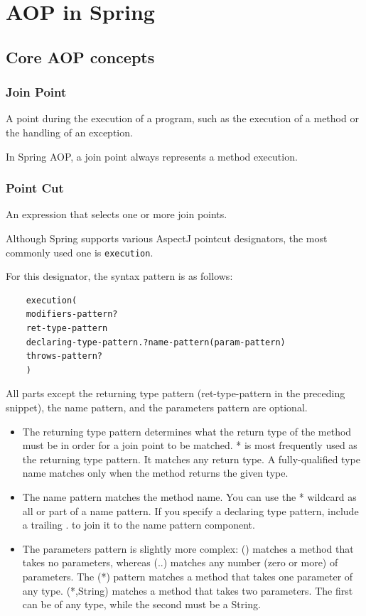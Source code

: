 \documentclass{scrartcl}
\begin{document}
\section{AOP in Spring}

\subsection{Core AOP concepts}

\subsubsection{Join Point}

A point during the execution of a program, such as the execution of a method or the handling of an exception.

In Spring AOP, a join point always represents a method execution.


\subsubsection{Point Cut}

An expression that selects one or more join points.

Although Spring supports various AspectJ pointcut designators, the most commonly used one is \lstinline{execution}.

For this designator, the syntax pattern is as follows:

\begin{lstlisting}
    execution(
    modifiers-pattern?
    ret-type-pattern
    declaring-type-pattern.?name-pattern(param-pattern)
    throws-pattern?
    )
\end{lstlisting}

All parts except the returning type pattern (ret-type-pattern in the preceding snippet), the name pattern, and the parameters pattern are optional.

\begin{itemize}
    \item The returning type pattern determines what the return type of the method must be in order for a join point to be matched. * is most frequently used as the returning type pattern. It matches any return type. A fully-qualified type name matches only when the method returns the given type.
    \item  The name pattern matches the method name. You can use the * wildcard as all or part of a name pattern. If you specify a declaring type pattern, include a trailing . to join it to the name pattern component.
    \item The parameters pattern is slightly more complex: () matches a method that takes no parameters, whereas (..) matches any number (zero or more) of parameters. The (*) pattern matches a method that takes one parameter of any type. (*,String) matches a method that takes two parameters. The first can be of any type, while the second must be a String.

\end{itemize}
\end{document}

